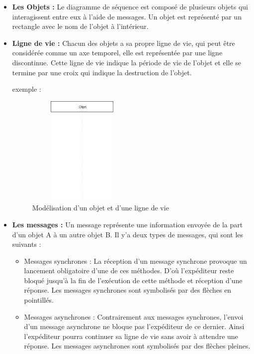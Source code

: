 \begin{itemize}
  
    \item \textbf{Les Objets :}
    Le diagramme de séquence est composé de plusieurs objets qui interagissent entre eux à l’aide de messages. Un objet est représenté par un rectangle avec le nom de l’objet à l’intérieur.
    
    \item \textbf{Ligne de vie :}
    Chacun des objets a sa propre ligne de vie, qui peut être considérée comme un axe temporel, elle est représentée par une ligne discontinue. Cette ligne de vie indique la période de vie de l’objet et elle se termine par une croix qui indique la destruction de l’objet.
        
       exemple :
       
       \begin{figure}[H]
        \centering
        \includegraphics[height=150pt,width=150pt]{img/chapter3/objet_ligne.png}
        \caption{Modélisation d'un objet et d'une ligne de vie}
       \end{figure}
       
        
    \item \textbf{Les messages :}
     Un message représente une information envoyée de la part d’un objet A à un autre objet B. Il y’a deux types de messages, qui sont les suivants :
    
    \begin{itemize}
        
    \item Messages synchrones : La réception d’un message synchrone provoque un lancement obligatoire d’une de ces méthodes. D’où l’expéditeur reste bloqué jusqu'à la fin de l’exécution de cette méthode et réception d’une réponse. Les messages synchrones sont symbolisés par des flèches en pointillés.
    
    \item Messages asynchrones : Contrairement aux messages synchrones, l’envoi d’un message asynchrone ne bloque pas l’expéditeur de ce dernier. Ainsi l’expéditeur pourra continuer sa ligne de vie sans avoir à attendre une réponse. Les messages asynchrones sont symbolisés par des flèches pleines.
 
    \end{itemize}       

\end{itemize}

